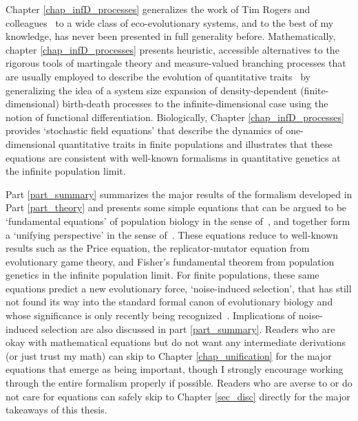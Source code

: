 Chapter \ref{chap_infD_processes} generalizes the work of Tim Rogers and colleagues~\citep{rogers_demographic_2012,rogers_spontaneous_2012,rogers_modes_2015} to a wide class of eco-evolutionary systems, and to the best of my knowledge, has never been presented in full generality before. Mathematically, chapter \ref{chap_infD_processes} presents heuristic, accessible alternatives to the rigorous tools of martingale theory and measure-valued branching processes that are usually employed to describe the evolution of quantitative traits~\citep{champagnat_unifying_2006,etheridge_mathematical_2011, week_white_2021} by generalizing the idea of a system size expansion of density-dependent (finite-dimensional) birth-death processes to the infinite-dimensional case using the notion of functional differentiation. Biologically, Chapter \ref{chap_infD_processes} provides `stochastic field equations' that describe the dynamics of one-dimensional quantitative traits in finite populations and illustrates that these equations are consistent with well-known formalisms in quantitative genetics at the infinite population limit.

Part \ref{part_summary} summarizes the major results of the formalism developed in Part \ref{part_theory} and presents some simple equations that can be argued to be `fundamental equations' of population biology in the sense of~\citet{queller_fundamental_2017}, and together form a `unifying perspective' in the sense of~\citet{lion_theoretical_2018}. These equations reduce to well-known results such as the Price equation, the replicator-mutator equation from evolutionary game theory, and Fisher's fundamental theorem from population genetics in the infinite population limit. For finite populations, these same equations predict a new evolutionary force, `noise-induced selection', that has still not found its way into the standard formal canon of evolutionary biology and whose significance is only recently being recognized~\citep{constable_demographic_2016,mcleod_social_2019,mazzolini_universality_2022, kuosmanen_turnover_2022}. Implications of noise-induced selection are also discussed in part \ref{part_summary}. Readers who are okay with mathematical equations but do not want any intermediate derivations (or just trust my math) can skip to Chapter \ref{chap_unification} for the major equations that emerge as being important, though I strongly encourage working through the entire formalism properly if possible. Readers who are averse to or do not care for equations can safely skip to Chapter \ref{sec_disc} directly for the major takeaways of this thesis.

